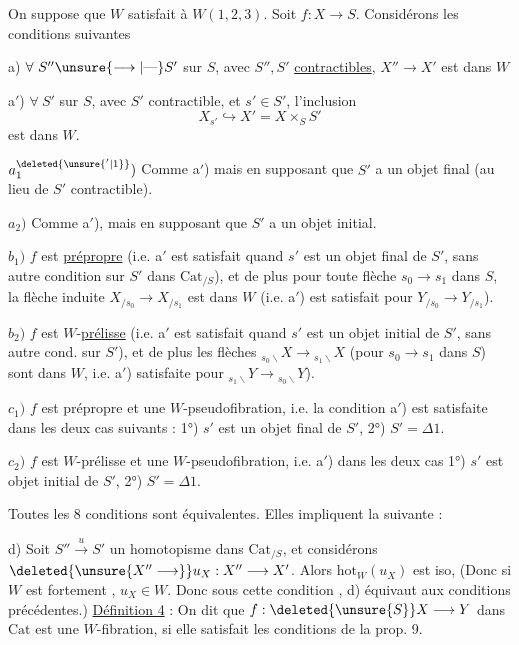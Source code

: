   On suppose que $W$ satisfait à $W(1,2,3)$. Soit $f:X\longrightarrow S$. Considérons les conditions suivantes

a)  $\forall\ S''\unsure{\longrightarrow|\text{---}}S'$ sur $S$, avec $S'',S'$ \uline{contractibles}, $X''\longrightarrow X'$ est dans $W$

a$'$) $\forall\ S'$ sur $S$, avec $S'$ contractible, et $s'\in S'$, l'inclusion
\[
X_{s'}\hookrightarrow X'=X\times_S S'
\]
est dans $W$.

$a^{\deleted{\unsure{'|1}}}_1)$ Comme a$'$) mais en supposant que $S'$ a un objet final (au lieu de $S'$ contractible).

$a_2)$ Comme a$'$), mais en supposant que $S'$ a un objet initial.

$b_1)$ $f$ est \uline{prépropre} (i.e. a$'$  est satisfait quand $s'$ est un objet final de $S'$, sans autre condition sur $S'$ dans $\mathrm{Cat}_{/S}$), et de plus pour toute flèche $s_0\longrightarrow s_1$ dans $S$, la flèche induite $X_{/s_0}\longrightarrow X_{/s_1}$ est dans $W$ (i.e. a$'$) est satisfait pour $Y_{/s_0}\longrightarrow Y_{/s_1}$).

$b_2)$ $f$ est $W$-\uline{prélisse} (i.e. a$'$ est satisfait quand $s'$ est un objet initial de $S'$, sans autre cond. sur $S'$), et de plus les flèches $ {}_{s_0\backslash}X\longrightarrow{}_{s_1\backslash}X$ (pour $s_0\to s_1$ dans $S$) sont dans $W$, i.e. a$'$) satisfaite pour $ {}_{s_1\backslash}Y\longrightarrow{}_{s_0\backslash}Y$).

$c_1)$ $f$ est prépropre\deleted{\unsure{,}} et  une $W$-pseudofibration, i.e. la condition a$'$) est satisfaite dans les deux cas suivants : 1°) $s'$ est un objet final de $S'$, 2°) $S'=\Delta1$.

$c_2)$ $f$ est $W$-prélisse et une $W$-pseudofibration, i.e. a$'$) dans les deux cas 1°) $s'$ est objet initial de $S'$, 2°) $S'=\Delta1$.

Toutes les 8 conditions sont équivalentes. Elles impliquent la suivante :

d) Soit $S''\overset{u}{\longrightarrow} S'$ un homotopisme dans $\mathrm{Cat}_{/S}$,  et considérons $\deleted{\unsure{X''\longrightarrow}}u_X:X''\longrightarrow X'$. Alors $\mathrm{hot}_W(u_X)$  est iso,
(Donc si $W$ est fortement , $u_X\in W$.  Donc sous cette condition , d) équivaut aux conditions précédentes.)
\uline{Définition 4} : On dit que $f:\deleted{\unsure{S}}X\longrightarrow Y$ dans $\mathrm{Cat}$ est une $W$-fibration, si elle satisfait les conditions  de la prop. 9.

